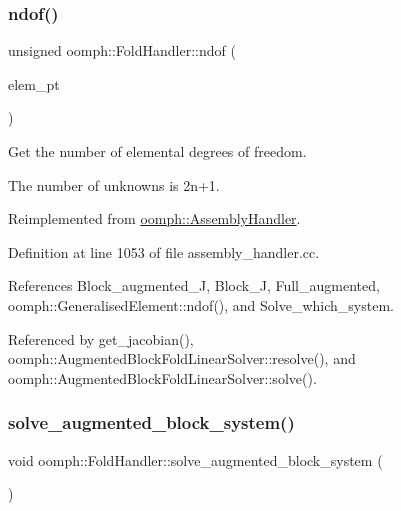 \subsubsection{\texorpdfstring{ndof()}{ndof()}}
{\footnotesize\ttfamily unsigned oomph\+::\+Fold\+Handler\+::ndof (\begin{DoxyParamCaption}\item[{\hyperlink{classoomph_1_1GeneralisedElement}{Generalised\+Element} $\ast$const \&}]{elem\+\_\+pt }\end{DoxyParamCaption})\hspace{0.3cm}{\ttfamily [virtual]}}



Get the number of elemental degrees of freedom. 

The number of unknowns is 2n+1. 

Reimplemented from \hyperlink{classoomph_1_1AssemblyHandler_a09213be8f4aa009e0366460a7ed78e68}{oomph\+::\+Assembly\+Handler}.



Definition at line 1053 of file assembly\+\_\+handler.\+cc.



References Block\+\_\+augmented\+\_\+J, Block\+\_\+J, Full\+\_\+augmented, oomph\+::\+Generalised\+Element\+::ndof(), and Solve\+\_\+which\+\_\+system.



Referenced by get\+\_\+jacobian(), oomph\+::\+Augmented\+Block\+Fold\+Linear\+Solver\+::resolve(), and oomph\+::\+Augmented\+Block\+Fold\+Linear\+Solver\+::solve().

\mbox{\label{classoomph_1_1FoldHandler_a7718a18444f6e328953dd5d5e73802f8}} 
\subsubsection{\texorpdfstring{solve\+\_\+augmented\+\_\+block\+\_\+system()}{solve\_augmented\_block\_system()}}
{\footnotesize\ttfamily void oomph\+::\+Fold\+Handler\+::solve\+\_\+augmented\+\_\+block\+\_\+system (\begin{DoxyParamCaption}{ }\end{DoxyParamCaption})}



